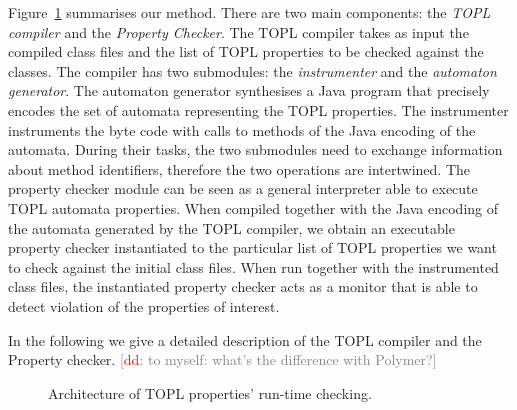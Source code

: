 \documentclass{llncs} %
\newcommand{\noterg}[2]{\textcolor{gray}{[\textcolor{red}{#1}: #2]}}
\newcommand{\dd}[1]{\noterg{dd}{#1}}
\newcommand{\dinocomment}[1]{\dd{#1}}
\begin{document}
Figure~\ref{architecture} summarises our method. There are two main components: the {\em TOPL compiler} and the {\em Property Checker}.
The TOPL compiler takes as input the compiled class files and the list of TOPL properties to be checked against the classes. The compiler has two submodules: the {\em instrumenter} and the {\em automaton generator}.
The automaton generator synthesises a Java program that precisely encodes the set of automata representing the TOPL properties. The instrumenter instruments the byte code with calls to methods of the Java encoding of the automata.
During their tasks, the two submodules need to exchange information about method identifiers, therefore the two operations are intertwined.   
The property checker module can be seen as a general interpreter able to execute TOPL automata properties. When compiled together with the Java encoding of the automata generated by the TOPL compiler, we obtain an executable property checker instantiated to the particular list of TOPL properties we want to check against the initial class files.
When run together with the instrumented class files, the instantiated property checker acts as a monitor that is able to detect violation of the properties of interest.

In the following we give a detailed description of the TOPL compiler and the Property checker.
\dinocomment{to myself: what's the difference with Polymer?}
%
\begin{figure}[htbp]
\begin{center}

\caption{Architecture of TOPL properties' run-time checking.}
\label{architecture}
\end{center}
\end{figure}
\end{document}
